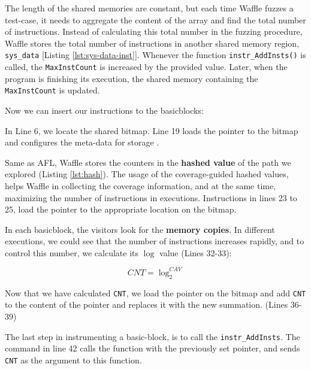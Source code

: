 The length of the shared memories are constant, but each time Waffle fuzzes a test-case, it needs to aggregate the content of the array and find the total number of instructions. Instead of calculating this total number in the fuzzing procedure, Waffle stores the total number of instructions in another shared memory region, \texttt{sys\_data} [Listing \ref{lst:sys-data-inst}]. Whenever the function \texttt{instr\_AddInsts()} is called, the \texttt{MaxInstCount} is increased by the provided value. Later, when the program is finishing its execution, the shared memory containing the \texttt{MaxInstCount} is updated. 



Now we can insert our instructions to the basicblocks:



In Line 6, we locate the shared bitmap. Line 19 loads the pointer to the bitmap and configures the meta-data for storage \cite{nosanitize}.

Same as AFL, Waffle stores the counters in the \textbf{hashed value} of the path we explored (Listing \ref{lst:hash}). The usage of the coverage-guided hashed values, helps Waffle in collecting the coverage information, and at the same time, maximizing the number of instructions in executions. Instructions in lines 23 to 25, load the pointer to the appropriate location on the bitmap.

In each basicblock, the visitors look for the \textbf{memory copies}. In different executions, we could see that the number of instructions increases rapidly, and to control this number, we calculate its $\log$ value (Lines 32-33):

\begin{equation}
  \label{eq:log}
  CNT = \log_{2}^{CAV} 
\end{equation}

Now that we have calculated \texttt{CNT}, we load the pointer on the bitmap and add \texttt{CNT} to the content of the pointer and replaces it with the new summation. (Lines 36-39)

The last step in instrumenting a basic-block, is to call the \texttt{instr\_AddInsts}. The command in line 42 calls the function with the previously set pointer, and sends \texttt{CNT} as the argument to this function.

